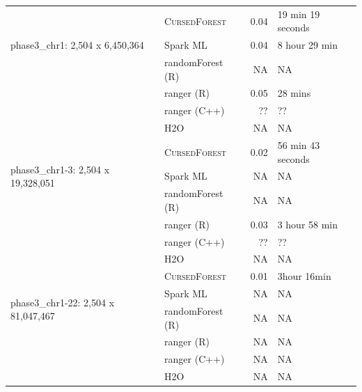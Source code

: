 \documentclass[10pt,letterpaper]{article}
\newcommand{\cursedforest}{\textsc{CursedForest}\ }
\begin{document}
\begin{table}[!ht]
\begin{minipage}{\textwidth}
\begin{tabular}{| l | l | r | l |}
\multirow{3}{*}{phase3\_chr1: 2,504 x 6,450,364}    & \cursedforest\ & 0.04  & 19 min 19 seconds         \\
                                                    & Spark ML  & 0.04       & 8 hour 29 min        \\
                                                    & randomForest (R)        & NA         & NA                \\
                                                    & ranger (R)      &  0.05       & 28 mins         \\
                                                    & ranger (C++)     & ??       & ??            \\
                                                    & H2O           & NA       & NA         \\
\hline

\multirow{3}{*}{phase3\_chr1-3: 2,504 x 19,328,051} & \cursedforest\ & 0.02  & 56 min 43 seconds             \\
                                                    & Spark ML &    NA         &   NA               \\
                                                    & randomForest (R)        & NA         & NA                \\
                                                    & ranger (R)      & 0.03      &    3 hour 58 min     \\
                                                    & ranger (C++)     & ??       & ??            \\
                                                    & H2O           & NA       & NA         \\
\hline

\multirow{4}{*}{phase3\_chr1-22: 2,504 x 81,047,467} & \cursedforest\ & 0.01  & 3hour 16min \\
                                                    & Spark ML & NA & NA  \\
                                                    & randomForest (R)        & NA         & NA                \\
                                                    & ranger (R)       &        NA     &        NA    \\
                                                    & ranger (C++)       &        NA     &        NA    \\
                                                    & H2O           & NA       & NA         \\
\hline





\end{tabular}
\end{minipage}
\end{table}
\end{document}
